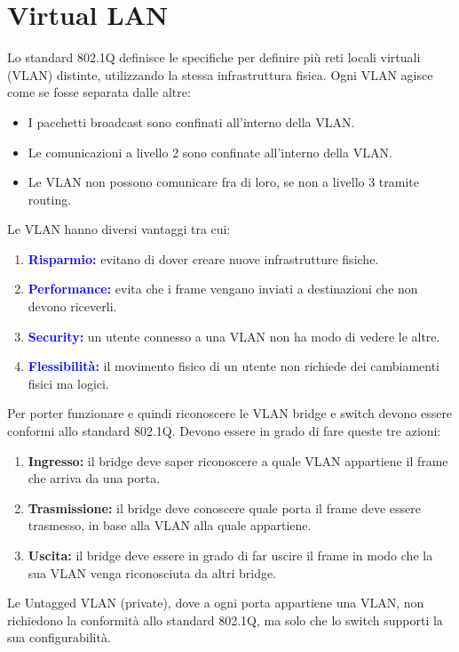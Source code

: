 \section{Virtual LAN}
Lo standard 802.1Q definisce le specifiche per definire più reti locali virtuali (VLAN) distinte, utilizzando la stessa infrastruttura fisica. Ogni VLAN agisce come se fosse separata dalle altre:
\begin{itemize}
    \item I pacchetti broadcast sono confinati all'interno della VLAN.
    \item Le comunicazioni a livello 2 sono confinate all'interno della VLAN.
    \item Le VLAN non possono comunicare fra di loro, se non a livello 3 tramite routing.
\end{itemize}
Le VLAN hanno diversi vantaggi tra cui:
\begin{enumerate}
    \item \textcolor{blue}{\textbf{Risparmio:}} evitano di dover creare nuove infrastrutture fisiche.
    \item \textcolor{blue}{\textbf{Performance:}} evita che i frame vengano inviati a destinazioni che non devono riceverli.
    \item \textcolor{blue}{\textbf{Security:}} un utente connesso a una VLAN non ha modo di vedere le altre.
    \item \textcolor{blue}{\textbf{Flessibilità:}} il movimento fisico di un utente non richiede dei cambiamenti fisici ma logici.
\end{enumerate}

Per porter funzionare e quindi riconoscere le VLAN bridge e switch devono essere conformi allo standard 802.1Q.
Devono essere in grado di fare queste tre azioni:
\begin{enumerate}
    \item \textbf{Ingresso:} il bridge deve saper riconoscere a quale VLAN appartiene il frame che arriva da una porta.
    \item \textbf{Trasmissione:} il bridge deve conoscere quale porta il frame deve essere trasmesso, in base alla VLAN alla quale appartiene.
    \item \textbf{Uscita:} il bridge deve essere in grado di far uscire il frame in modo che la sua VLAN venga riconosciuta da altri bridge.
\end{enumerate}
Le Untagged VLAN (private), dove a ogni porta appartiene una VLAN, non richiedono la conformità allo standard 802.1Q, ma solo che lo switch supporti la sua configurabilità.

